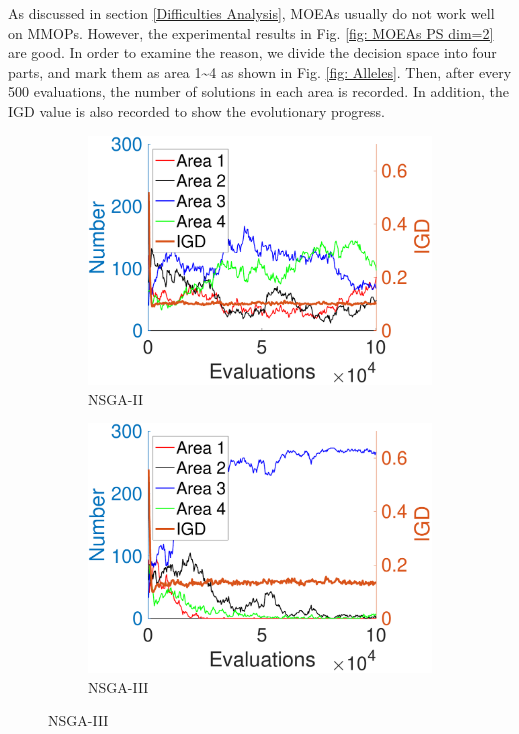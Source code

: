 \documentclass[conference]{IEEEtran}
\begin{document}
As discussed in section \ref{Difficulties Analysis}, MOEAs usually do not work well on MMOPs. However, the experimental results in Fig. \ref{fig: MOEAs PS dim=2} are good. In order to examine the reason, we divide the decision space into four parts, and mark them as area 1\textasciitilde 4  as shown in Fig. \ref{fig: Alleles}. Then, after every 500 evaluations, the number of solutions in each area is recorded. In addition, the IGD value is also recorded to show the evolutionary progress. 

\begin{figure}[t!]
    \centering
    \begin{subfigure}[b]{.24\textwidth}
    \includegraphics[width=\linewidth]{Section5/dim2/Diversity/NSGAII}
    \caption{NSGA-II}
    \end{subfigure}
    \begin{subfigure}[b]{.24\textwidth}
    \includegraphics[width=\linewidth]{Section5/dim2/Diversity/NSGAIII}
    \caption{NSGA-III}
    \label{fig: NSGA-III Diversity dim=2}
    

\end{subfigure}
\end{figure}
\end{document}
